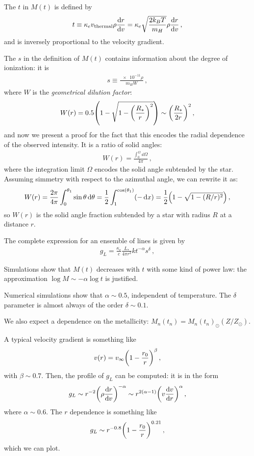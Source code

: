 \documentclass[main.tex]{subfiles}
\begin{document}
The \(t\) in \(M(t)\) is defined by 
%
\begin{align}
  t \equiv \kappa _e v _{\text{thermal}} \rho \dv{r}{v}
  = \kappa_e \sqrt{\frac{2 k_B T}{m_H}} \rho \dv{r}{v}
\,,
\end{align}
%
and is inversely proportional to the velocity gradient.

The \(s\) in the definition of \(M(t)\) contains information about the degree of ionization: it is 
%
\begin{align}
  s \equiv \frac{\num{e-11} \rho }{m_H W}
\,,
\end{align}
%
where \(W\) is the \emph{geometrical dilution factor}: 
%
\begin{align}
  W(r) = 0.5 \qty(1 - \sqrt{1 - \qty(\frac{R_{*}}{r})^2})
  \sim \qty(\frac{R_{*}}{2r})^2
\,,
\end{align}
%
and now we present a proof for the fact that this encodes the radial dependence of the observed intensity. 
It is a ratio of solid angles: 
%
\begin{align}
  W(r) = \frac{\int _{0}^{\Omega } \dd{\Omega } }{4 \pi }
\,,
\end{align}
%
where the integration limit \(\Omega \) encodes the solid angle subtended by the star.
Assuming simmetry with respect to the azimuthal angle, we can rewrite it as: 
%
\begin{align}
  W (r) = \frac{2 \pi }{4 \pi } \int _{0}^{\theta_1 } \sin \theta  \dd{\theta } 
  = \frac{1}{2} \int _1^{\cos(\theta_1 )} (-\dd{x}) 
  = \frac{1}{2} \qty(1 - \sqrt{1 - (R/r)^2})
\,,
\end{align}
%
so \(W(r)\) is the solid angle fraction subtended by a star with radius \(R\) at a distance \(r\). 

The complete expression for an ensemble of lines is given by 
%
\begin{align}
  g_L = \frac{\kappa _e}{ c} \frac{L_{*}}{4 \pi r^2} k t^{- \alpha } s^{ \delta }
\,,
\end{align}
%

Simulations show that \(M(t)\) decreases with \(t\) with some kind of power law: the approximation \(\log M \sim - \alpha \log t\) is justified. 

Numerical simulations show that \(\alpha \sim 0.5\), independent of temperature.
The \(\delta\) parameter is almost always of the order \(\delta \sim 0.1\).

We also expect a dependence on the metallicity: \(M_n(t_n) = M_n (t_n)_{\odot} (Z/Z_{\odot})\).

A typical velocity gradient is something like 
%
\begin{align}
  v(r) = v_{ \infty } \qty(1 - \frac{r_0 }{r})^{\beta }
\,,
\end{align}
%
with \(\beta \sim 0.7\).
Then, the profile of \(g_L\) can be computed: it is in the form 
%
\begin{align}
  g_L \sim r^{-2} \qty(\rho \dv{r}{v})^{-\alpha }
  \sim r^{2(\alpha -1)} \qty(v \dv{v}{r})^{\alpha }
\,,
\end{align}
%
where \(\alpha \sim 0.6\). The \(r\) dependence is something like 
%
\begin{align}
  g_L \sim r^{-0.8} \qty(1 - \frac{r_0 }{r})^{0.21}
\,,
\end{align}
%
which we can plot. 
\end{document}
